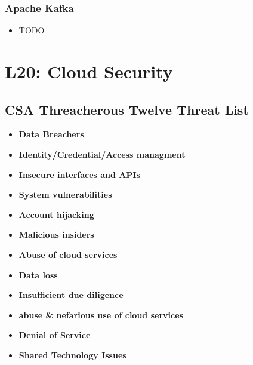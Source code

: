\documentclass[a4paper]{article}
\begin{document}
\begin{multicols}{3}
\subsubsection{Apache Kafka}
\begin{itemize}
    \item TODO
\end{itemize}

\section{L20: Cloud Security}

\subsection{CSA Threacherous Twelve Threat List}
\begin{itemize}
    \item \textbf{Data Breachers}
    \item \textbf{Identity/Credential/Access managment}
    \item \textbf{Insecure interfaces and APIs}
    \item \textbf{System vulnerabilities}
    \item \textbf{Account hijacking}
    \item \textbf{Malicious insiders}
    \item \textbf{Abuse of cloud services}
    \item \textbf{Data loss}
    \item \textbf{Insufficient due diligence}
    \item \textbf{abuse \& nefarious use of cloud services}
    \item \textbf{Denial of Service}
    \item \textbf{Shared Technology Issues}
\end{itemize}


\end{multicols}
\end{document}
